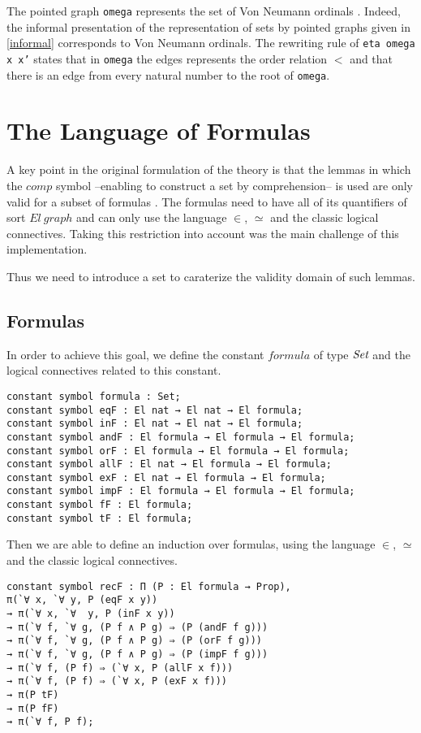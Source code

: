 \documentclass[submission,copyright,creativecommons]{eptcs}
\def\Set{\mbox{\it Set}}
\begin{document}
The pointed graph \texttt{omega} represents the set of Von Neumann ordinals \cite[see Table 2]{zermodulo53}. Indeed, the informal presentation of the representation of sets by pointed graphs given in \ref{informal} corresponds to Von Neumann ordinals. The rewriting rule of \texttt{eta omega x x'} states that in \texttt{omega} the edges represents the order relation $<$ and that there is an edge from every natural number to the root of \texttt{omega}.


\section{The Language of Formulas}

A key point in the original formulation of the theory is that the lemmas in which the $comp$ symbol --enabling to construct a set by comprehension-- is used are only valid for a subset of formulas \cite[see Table 5]{zermodulo}. The formulas need to have all of its quantifiers of sort $El~graph$ and can only use the language $\in$, $\simeq$ and the classic logical connectives. Taking this restriction into account was the main challenge of this implementation.

Thus we need to introduce a set to caraterize the validity domain of such lemmas.

\subsection{Formulas}

In order to achieve this goal, we define the constant $formula$ of type $\Set$ and the logical connectives related to this constant.

\begin{lstlisting}
constant symbol formula : Set;
constant symbol eqF : El nat → El nat → El formula;
constant symbol inF : El nat → El nat → El formula;
constant symbol andF : El formula → El formula → El formula;
constant symbol orF : El formula → El formula → El formula;
constant symbol allF : El nat → El formula → El formula;
constant symbol exF : El nat → El formula → El formula;
constant symbol impF : El formula → El formula → El formula;
constant symbol fF : El formula;
constant symbol tF : El formula;
\end{lstlisting}

Then we are able to define an induction over formulas, using the language $\in$, $\simeq$ and the classic logical connectives.

\begin{lstlisting}
constant symbol recF : Π (P : El formula → Prop), 
π(`∀ x, `∀ y, P (eqF x y))
→ π(`∀ x, `∀  y, P (inF x y))
→ π(`∀ f, `∀ g, (P f ∧ P g) ⇒ (P (andF f g)))
→ π(`∀ f, `∀ g, (P f ∧ P g) ⇒ (P (orF f g)))
→ π(`∀ f, `∀ g, (P f ∧ P g) ⇒ (P (impF f g)))
→ π(`∀ f, (P f) ⇒ (`∀ x, P (allF x f)))
→ π(`∀ f, (P f) ⇒ (`∀ x, P (exF x f)))
→ π(P tF)
→ π(P fF)
→ π(`∀ f, P f);
\end{lstlisting}
\end{document}
